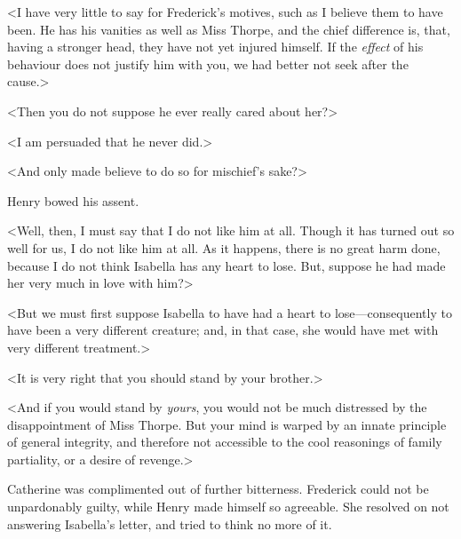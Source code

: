  <I have very little to say for Frederick's motives, such as I believe them to have been. He has his vanities as well as Miss Thorpe, and the chief difference is, that, having a stronger head, they have not yet injured himself. If the \textit{effect} of his behaviour does not justify him with you, we had better not seek after the cause.> 

 <Then you do not suppose he ever really cared about her?> 

 <I am persuaded that he never did.> 

 <And only made believe to do so for mischief's sake?> 

 Henry bowed his assent. 

 <Well, then, I must say that I do not like him at all. Though it has turned out so well for us, I do not like him at all. As it happens, there is no great harm done, because I do not think Isabella has any heart to lose. But, suppose he had made her very much in love with him?> 

 <But we must first suppose Isabella to have had a heart to lose—consequently to have been a very different creature; and, in that case, she would have met with very different treatment.> 

 <It is very right that you should stand by your brother.> 

 <And if you would stand by \textit{yours}, you would not be much distressed by the disappointment of Miss Thorpe. But your mind is warped by an innate principle of general integrity, and therefore not accessible to the cool reasonings of family partiality, or a desire of revenge.> 

 Catherine was complimented out of further bitterness. Frederick could not be unpardonably guilty, while Henry made himself so agreeable. She resolved on not answering Isabella's letter, and tried to think no more of it. 
